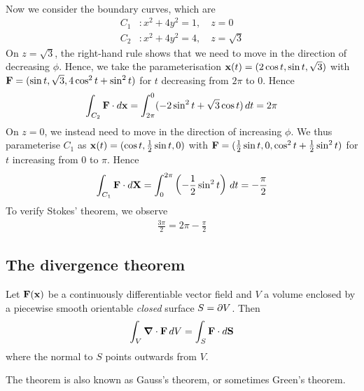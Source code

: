 \documentclass{../template/note}
\begin{document}
\begin{example*}[hard]
\begin{align*}
        \end{align*}
        Now we consider the boundary curves, which are
        \begin{align*}
            C_1&: x^2 + 4y^2 = 1, \quad z = 0 \\
            C_2&: x^2 + 4y^2 = 4, \quad z = \sqrt 3
        \end{align*}
        On \(z = \sqrt 3\), the right-hand rule shows that we need to move in the direction of decreasing \(\phi\). Hence, we take the parameterisation \(\V x(t) = (2 \cos t, \sin t, \sqrt 3)\) with \(\V F = (\sin t, \sqrt 3, 4\cos^2 t + \sin^2 t)\) for \(t\) decreasing from \(2\pi\) to 0. Hence
        \begin{align*}
            \int_{C_2} \V F \cdot d \V x = \int_{2\pi}^0 (-2 \sin^2 t + \sqrt 3 \cos t) \D t = 2 \pi
        \end{align*}
        On \(z = 0\), we instead need to move in the direction of increasing \(\phi\). We thus parameterise \(C_1\) as \(\V x(t) = (\cos t, \frac 1 2 \sin t, 0)\) with \(\V F = (\frac 1 2 \sin t, 0, \cos^2 t + \frac 1 2 \sin^2 t)\) for \(t\) increasing from 0 to \(\pi\). Hence
        \begin{align*}
            \int_{C_1} \V F \cdot d \V X = \int_0^{2\pi} \left(-\frac 1 2 \sin^2 t\right) \D t = -\frac{\pi} 2
        \end{align*}
        To verify Stokes' theorem, we observe
        \begin{align*}
            \frac{3\pi} 2 = 2 \pi - \frac{\pi} 2
        \end{align*}
    \end{example*}

    \subsection{The divergence theorem}

    \begin{theorem}
        \label{6.3}
        Let \(\V F(\V x)\) be a continuously differentiable vector field and \(V\) a volume enclosed by a piecewise smooth orientable \emph{closed} surface \(S = \partial V\). Then
        \begin{align*}
            \int_V \div \V F \, d V = \int_S \V F \cdot d \V S
        \end{align*}
        where the normal to \(S\) points outwards from \(V\).        
    \end{theorem}
    The theorem is also known as Gauss's theorem, or sometimes Green's theorem.
\end{document}
